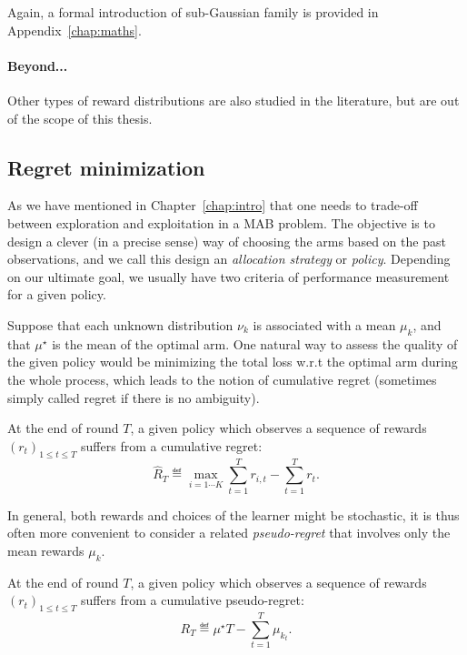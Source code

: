 Again, a formal introduction of sub-Gaussian family is provided in Appendix~\ref{chap:maths}.

\paragraph{Beyond...}

Other types of reward distributions are also studied in the literature, but are out of the scope of this thesis.

\subsection{Regret minimization}\label{sec:mab.model.regret}

As we have mentioned in Chapter~\ref{chap:intro} that one needs to trade-off between exploration and exploitation in a MAB problem. The objective is to design a clever (in a precise sense) way of choosing the arms based on the past observations, and we call this design an \emph{allocation strategy} or \emph{policy}. Depending on our ultimate goal, we usually have two criteria of performance measurement for a given policy.

Suppose that each unknown distribution $\nu_k$ is associated with a mean $\mu_k$, and that $\mu^{\star}$ is the mean of the optimal arm. One natural way to assess the quality of the given policy would be minimizing the total loss w.r.t the optimal arm during the whole process, which leads to the notion of \gls{cumulative regret} (sometimes simply called regret if there is no ambiguity).

\begin{definition}\label{def:mab.cumulative_regret}
\begin{leftbar}[defnbar]
	At the end of round $T$, a given policy which observes a sequence of rewards $(r_t)_{1 \leq t \leq T}$ suffers from a cumulative regret:
	\[
		\hat{R}_T \eqdef \max_{i=1\cdots K} \sum_{t=1}^T r_{i,t} - \sum_{t=1}^T r_t.
	\]
\end{leftbar}
\end{definition}

In general, both rewards and choices of the learner might be stochastic, it is thus often more convenient to consider a related \emph{pseudo-regret} that involves only the mean rewards $\mu_k$.

\begin{definition}\label{def:mab.pseudo_regret}
\begin{leftbar}[defnbar]
	At the end of round $T$, a given policy which observes a sequence of rewards $(r_t)_{1 \leq t \leq T}$ suffers from a cumulative pseudo-regret:
	\[
		R_T \eqdef \mu^{\star}T - \sum_{t=1}^T \mu_{k_t}.
	\]
\end{leftbar}
\end{definition}

